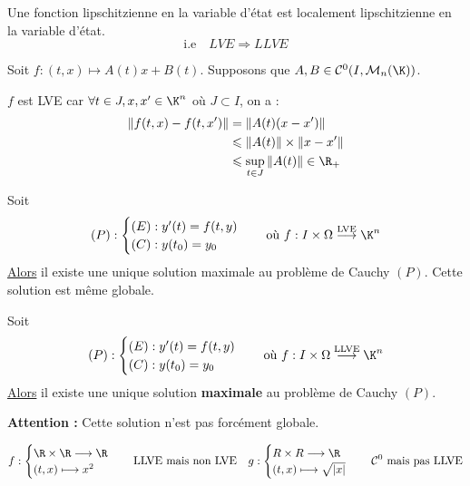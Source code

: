 \begin{remark}
    Une fonction lipschitzienne en la variable d'état est localement lipschitzienne en la variable d'état. 
    \[ \text{i.e} \quad LVE \Longrightarrow LLVE \] 
\end{remark}

\begin{example}
    Soit $f : (t,x) \longmapsto A(t)x + B(t)$. Supposons que $A, B \in \mathcal{C}^0(I, \mathcal{M}_n(\K))$.

    $f$ est LVE car $ \forall t \in J, x,x' \in \K^n$ où $J \subset I$, on a : 
        \begin{align*}
            \| f(t,x) - f(t,x') \| &= \| A(t) (x-x') \| \\ 
            & \leqslant \| A(t)\| \times \| x-x'\| \\ 
            & \leqslant \sup_{t \in J} \| A(t) \| \in \R_+ 
        \end{align*}
\end{example}

\begin{theorem}
    Soit 
        \[ (P) : 
            \begin{cases}
                (E) : y'(t) = f(t,y) \\ 
                (C) : y(t_0) = y_0
            \end{cases} 
        \quad \text{où } f : I \times \Omega \overset{\text{LVE}}{\longrightarrow} \K^n \] 
    \underline{Alors} il existe une unique solution maximale au problème de Cauchy $(P)$. 
    Cette solution est même globale. 
\end{theorem}

\begin{theorem}
    Soit 
        \[ (P) : 
            \begin{cases}
                (E) : y'(t) = f(t,y) \\ 
                (C) : y(t_0) = y_0
            \end{cases} 
        \quad \text{où } f : I \times \Omega \overset{\text{LLVE}}{\longrightarrow} \K^n \] 
    \underline{Alors} il existe une unique solution \textbf{maximale} au problème de Cauchy $(P)$. 
\end{theorem}

\textbf{Attention : } Cette solution n'est pas forcément globale. 

\begin{example}
    \[ f : 
        \begin{cases}
            \R \times \R \longrightarrow \R \\ 
            (t,x) \longmapsto x^2
        \end{cases} 
        \quad \text{LLVE mais non LVE} 
        \quad  g : 
        \begin{cases}
            R \times R \longrightarrow \R \\ 
            (t,x) \longmapsto \sqrt{|x|}
        \end{cases}
        \quad \mathcal{C}^0 \text{ mais pas LLVE} \] 
\end{example}

